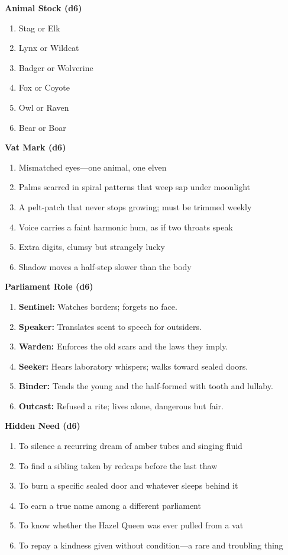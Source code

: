 \begin{tcolorbox}[colback=black!3,colframe=black!40!white,title={Beast-Kin Mini Generator},breakable]
\textbf{Animal Stock (d6)}
\begin{enumerate}
\item Stag or Elk
\item Lynx or Wildcat
\item Badger or Wolverine
\item Fox or Coyote
\item Owl or Raven
\item Bear or Boar
\end{enumerate}

\textbf{Vat Mark (d6)}
\begin{enumerate}
\item Mismatched eyes---one animal, one elven
\item Palms scarred in spiral patterns that weep sap under moonlight
\item A pelt-patch that never stops growing; must be trimmed weekly
\item Voice carries a faint harmonic hum, as if two throats speak
\item Extra digits, clumsy but strangely lucky
\item Shadow moves a half-step slower than the body
\end{enumerate}

\textbf{Parliament Role (d6)}
\begin{enumerate}
\item \textbf{Sentinel:} Watches borders; forgets no face.
\item \textbf{Speaker:} Translates scent to speech for outsiders.
\item \textbf{Warden:} Enforces the old scars and the laws they imply.
\item \textbf{Seeker:} Hears laboratory whispers; walks toward sealed doors.
\item \textbf{Binder:} Tends the young and the half-formed with tooth and lullaby.
\item \textbf{Outcast:} Refused a rite; lives alone, dangerous but fair.
\end{enumerate}

\textbf{Hidden Need (d6)}
\begin{enumerate}
\item To silence a recurring dream of amber tubes and singing fluid
\item To find a sibling taken by redcaps before the last thaw
\item To burn a specific sealed door and whatever sleeps behind it
\item To earn a true name among a different parliament
\item To know whether the Hazel Queen was ever pulled from a vat
\item To repay a kindness given without condition---a rare and troubling thing
\end{enumerate}
\end{tcolorbox}

